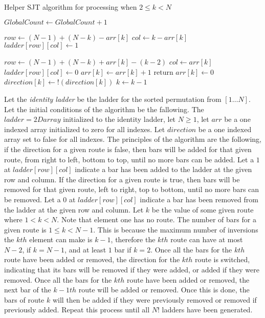 \begin{algorithm}
  \caption{Helper SJT algorithm for processing when $2 \leq k < N$}
  \begin{algorithmic}[1]

        \State $GlobalCount \gets GlobalCount + 1$

            \State $row \gets (N-1) + (N-k) - arr[k]$
            \State $col \gets k - arr[k]$
            \State $ladder[row][col] \gets 1$

          \Else
            \State $row \gets  (N-1) + (N-k) + arr[k] - (k-2)$
            \State $col \gets arr[k]$
            \State $ladder[row][col] \gets 0$
          \EndIf
          \State $arr[k]\gets arr[k]+1$
          \State return
        \Else 
          \State $arr[k] \gets 0$
          \State $direction[k] \gets !(direction[k])$
        \EndIf
        $k \gets k-1$
      \EndFor
      \EndFunction
  \end{algorithmic}
\end{algorithm}
\pagebreak

Let the \emph{identity ladder} be the ladder for the sorted permutation from $[1 \dots N]$.
Let the initial conditions of the algorithm be the fallowing. The $ladder= 2D array$ initialized to the identity ladder,  
let $N \geq 1$, let $arr$ be a one indexed array initialized to zero for all indexes. Let $direction$ be a one 
indexed array set to false for all indexes. The principles of the algorithm are the following, if the direction for a 
given route is false, then bars will be added for that given route, from right to left, bottom to top, until no more bars can be added. Let a 
$1$ at $ladder[row][col]$ indicate a bar has been added to the ladder at the given row and column.
If the direction for a given route is true, then bars will be removed for that given route, left to right, top to bottom, until 
no more bars can be removed. Let a $0$ at $ladder[row][col]$ indicate a bar has been removed from the ladder 
at the given row and column. Let $k$ be the value of some given route where $1 < k < N$. Note that element one has no route.
The number of bars for a given route is $1 \leq k < N-1$. This is because the maximum number of inversions 
the $kth$ element can make is $k-1$, therefore the $kth$ route can have at most $N-2$, if $k=N-1$, and 
at least $1$ bar if $k=2$. Once all the bars for the $kth$ route have been added 
or removed, the direction for the $kth$ route is switched, indicating that its bars will be removed if they 
were added, or added if they were removed. Once all the bars for the $kth$ route have been added or removed, 
the next bar of the $k-1th$ route will be added or removed. Once this is done, the bars of route $k$ will 
then be added if they were previously removed or removed if previously added. Repeat this process until all
$N!$ ladders have been generated.

